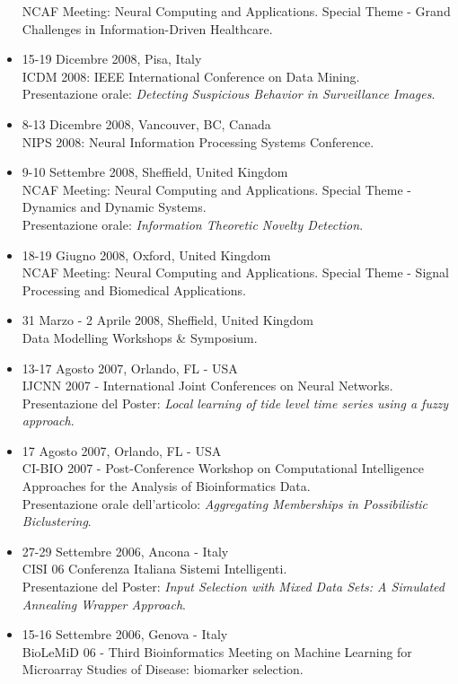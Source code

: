 \documentclass[a4paper,10pt]{article}
\begin{document}
\begin{itemize}
  NCAF Meeting: Neural Computing and Applications. Special Theme - Grand Challenges in Information-Driven Healthcare.
\item 15-19 Dicembre 2008, Pisa, Italy \\
  ICDM 2008: IEEE International Conference on Data Mining.
  \\Presentazione orale: \emph{Detecting Suspicious Behavior in Surveillance Images}.
\item 8-13 Dicembre 2008, Vancouver, BC, Canada \\
  NIPS 2008: Neural Information Processing Systems Conference.
\item 9-10 Settembre 2008, Sheffield, United Kingdom \\
  NCAF Meeting: Neural Computing and Applications. Special Theme - Dynamics and Dynamic Systems.
  \\Presentazione orale: \emph{Information Theoretic Novelty Detection}.
\item 18-19 Giugno 2008, Oxford, United Kingdom \\
  NCAF Meeting: Neural Computing and Applications. Special Theme - Signal Processing and Biomedical Applications.
\item 31 Marzo - 2 Aprile 2008, Sheffield, United Kingdom \\
  Data Modelling Workshops \& Symposium.
\item 13-17 Agosto 2007, Orlando, FL - USA \\
  IJCNN 2007 - International Joint Conferences on Neural Networks.
  \\Presentazione del Poster: \emph{Local learning of tide level time series using a fuzzy approach}.
\item 17 Agosto 2007, Orlando, FL - USA \\
  CI-BIO 2007 - Post-Conference Workshop on Computational Intelligence Approaches for the Analysis of Bioinformatics Data.
  \\Presentazione orale dell'articolo: \emph{Aggregating Memberships in Possibilistic Biclustering}.
\item 27-29 Settembre 2006, Ancona - Italy \\
  CISI 06 Conferenza Italiana Sistemi Intelligenti.
  \\Presentazione del Poster: \emph{Input Selection with Mixed Data Sets: A Simulated Annealing Wrapper Approach}.
\item 15-16 Settembre 2006, Genova - Italy \\
  BioLeMiD 06 - Third Bioinformatics Meeting on Machine Learning for Microarray Studies of Disease: biomarker selection.

\end{itemize}
\end{document}
